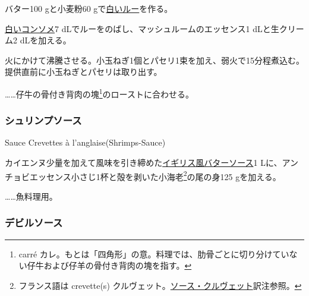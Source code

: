 \begin{recette}
バター100 gと小麦粉60
gで\protect\hyperlink{roux-blanc}{白いルー}を作る。

\protect\hyperlink{consomme-blanc}{白いコンソメ}7
dLでルーをのばし、マッシュルームのエッセンス1 dLと生クリーム2
dLを加える。

火にかけて沸騰させる。小玉ねぎ1個とパセリ1束を加え、弱火で15分程煮込む。提供直前に小玉ねぎとパセリは取り出す。

\ldots{}\ldots{}仔牛の骨付き背肉の塊\footnote{carré
  カレ。もとは「四角形」の意。料理では、肋骨ごとに切り分けていない仔牛および仔羊の骨付き背肉の塊を指す。}のローストに合わせる。

\atoaki{}

\hypertarget{shrimps-sauce}{%
\subsubsection{シュリンプソース}\label{shrimps-sauce}}

\begin{frsubenv}

Sauce Crevettes à l'anglaise\hspace{1em}\normalfont(Shrimps-Sauce)

\end{frsubenv}


カイエンヌ少量を加えて風味を引き締めた\protect\hyperlink{butter-sauce}{イギリス風バターソース}1
Lに、アンチョビエッセンス小さじ1杯と殻を剥いた小海老\footnote{フランス語は
  crevette(s)
  クルヴェット。\protect\hyperlink{sauce-aux-crevettes}{ソース・クルヴェット}訳注参照。}の尾の身125
gを加える。

\ldots{}\ldots{}魚料理用。

\atoaki{}

\hypertarget{devilled-sauce}{%
\subsubsection{デビルソース}\label{devilled-sauce}}


\end{recette}
